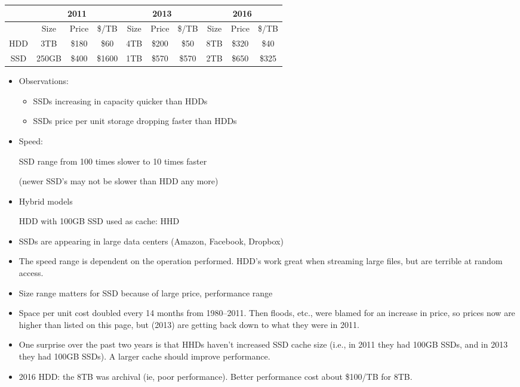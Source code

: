 \begin{frame}[fragile]
{\small
\begin{tabular}{c|ccc|ccc|ccc}
&\multicolumn{3}{c|}{2011}
&\multicolumn{3}{c|}{2013}
&\multicolumn{3}{c}{2016}\\
\hline
&Size & Price & \$/TB& Size & Price & \$/TB& Size & Price & \$/TB\\
\hline
HDD & 3TB & \$180 & \$60 & 4TB & \$200 & \$50 & 8TB & \$320 & \$40 \\
SSD & 250GB & \$400 & \$1600 & 1TB & \$570 & \$570 & 2TB & \$650 & \$325 \\
\end{tabular}
}

\begin{itemize}
\item Observations:
\begin{itemize}
	\item SSDs increasing in capacity quicker than HDDs
	\item SSDs price per unit storage dropping faster than HDDs
\end{itemize}
\item Speed:

	SSD range from 100 times slower to 10 times faster

	(newer SSD's may not be slower than HDD any more)

\item Hybrid models 

	HDD with 100GB SSD used as cache: HHD
\item SSDs are appearing in large data centers (Amazon, Facebook, Dropbox)
\end{itemize}
\BNotes\ifnum{}
\begin{itemize}
\item The speed range is dependent on the operation performed.  HDD's work
	great when streaming large files, but are terrible at random
	access.

\item Size range matters for SSD because of large price, performance range

\item Space per unit cost doubled every 14 months from 1980--2011.
	Then floods, etc., were blamed for an increase in price, so
	prices now are higher than listed on this page, but (2013) are
	getting back down to what they were in 2011.
\item One surprise over the past two years is that HHDs haven't increased
	SSD cache size (i.e., in 2011 they had 100GB SSDs, and in 2013 they
	had 100GB SSDs).  A larger cache should improve performance.
\item 2016 HDD: the 8TB was archival (ie, poor performance).  Better 
	performance cost about \$100/TB for 8TB.
\end{itemize}
\fi\ENotes
\end{frame}



